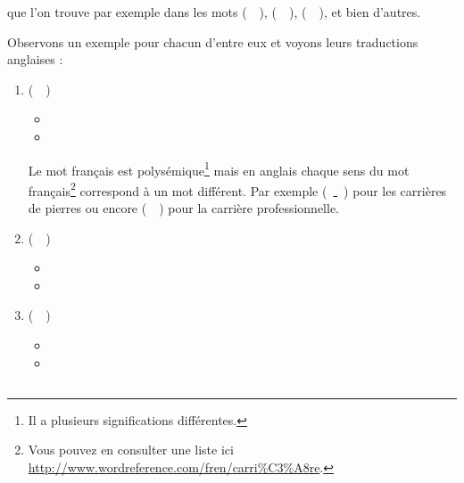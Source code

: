 que l'on trouve par exemple dans les mots 
(~~),  (~~),  (~~), et bien d'autres.

Observons un exemple pour chacun d'entre eux et voyons leurs
traductions anglaises :\par

\begin{enumerate}
\item {} (~~)
  \begin{itemize}
  \item {}
    \item {}
    \end{itemize}
    Le mot français  est polysémique\footnote{Il a
      plusieurs significations différentes.} mais en anglais chaque
    sens du mot français\footnote{Vous pouvez en consulter une liste
      ici \url{http://www.wordreference.com/fren/carri\%C3\%A8re}.}  correspond à un mot différent. Par exemple
    (~\href{https://en.oxforddictionaries.com/definition/quarry}{
      }~) pour les carrières de pierres ou encore 
    (~\href{https://en.oxforddictionaries.com/definition/career}{}~)
    pour la carrière professionnelle.
\item {} (~~)
  \begin{itemize}
  \item {}
  \item {}
  \end{itemize}

  
\item {} (~~)
  \begin{itemize}
  \item {}
  \item {}
  \end{itemize}
   
\end{enumerate}

\subsection{}\label{subsec:əfr}

